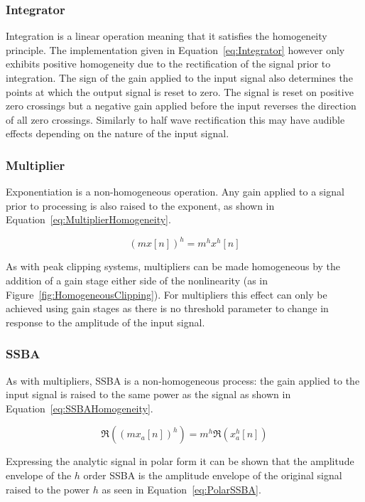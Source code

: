 		\subsubsection*{Integrator}
			Integration is a linear operation meaning that it satisfies the homogeneity principle. The
			implementation given in Equation~\ref{eq:Integrator} however only exhibits positive homogeneity due
			to the rectification of the signal prior to integration. The sign of the gain applied to the input
			signal also determines the points at which the output signal is reset to zero. The signal is reset
			on positive zero crossings but a negative gain applied before the input reverses the direction of
			all zero crossings. Similarly to half wave rectification this may have audible effects depending on
			the nature of the input signal.

		\subsubsection*{Multiplier}
			Exponentiation is a non-homogeneous operation. Any gain applied to a signal prior to processing is
			also raised to the exponent, as shown in Equation~\ref{eq:MultiplierHomogeneity}.

			\begin{equation}
				(mx[n])^{h} = m^{h}x^{h}[n]
				\label{eq:MultiplierHomogeneity}
			\end{equation}

			As with peak clipping systems, multipliers can be made homogeneous by the addition of a gain stage
			either side of the nonlinearity (as in Figure~\ref{fig:HomogeneousClipping}). For multipliers this
			effect can only be achieved using gain stages as there is no threshold parameter to change in
			response to the amplitude of the input signal.

		\subsubsection*{SSBA}
			As with multipliers, SSBA is a non-homogeneous process: the gain applied to the input signal is
			raised to the same power as the signal as shown in Equation~\ref{eq:SSBAHomogeneity}.

			\begin{equation}
				\Re \left( (mx_{a}[n])^{h} \right) = m^{h} \Re \left( x_{a}^{h}[n] \right)
				\label{eq:SSBAHomogeneity}
			\end{equation}
			
			Expressing the analytic signal in polar form it can be shown that the amplitude envelope of the
			$h$ order SSBA is the amplitude envelope of the original signal raised to the power $h$
			as seen in Equation~\ref{eq:PolarSSBA}.

